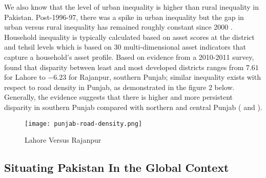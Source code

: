 \documentclass[12pt]{article}
\newcommand{\1}{\mathbbm 1}
\begin{document}
	 
	
	We also know that the level of urban inequality is higher than rural inequality in Pakistan. Post-1996-97, there was a spike in urban inequality but the gap in urban versus rural inequality has remained roughly constant since 2000 \cite{burki2015multiple}. Household inequality is typically calculated based on asset scores at the district and tehsil levels which is based on 30 multi-dimensional asset indicators that capture a household's asset profile.  Based on evidence from a 2010-2011 survey, \cite{burki2015multiple} found that disparity between least and most developed districts ranges from $7.61$ for Lahore to $-6.23$ for Rajanpur, southern Punjab; similar inequality exists with respect to road density in Punjab, as demonstrated in the figure 2 below. Generally, the evidence suggests that there is higher and more persistent disparity in southern Punjab compared with northern and central Punjab (\cite{mohey2017exploring} and \cite{burki2021LUMS}).
	
	
	\begin{figure}[H]
		\begin{center}
			\texttt{[image: punjab-road-density.png]}		
			\caption{Lahore Versus Rajanpur \cite{burki2015multiple}}
		\end{center}
	\end{figure}
	
	

	
	
	

	
	
	
	
	
	
	
	
	

     \subsection{Situating Pakistan In the Global Context}
	
\end{document}
